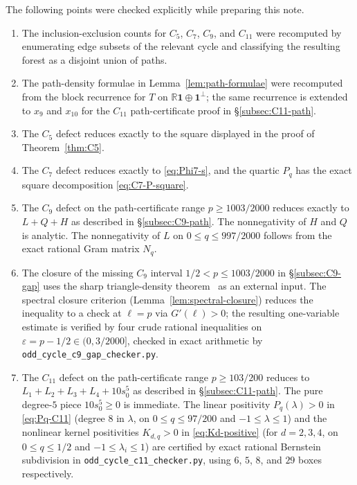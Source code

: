 \documentclass[11pt]{article}
\newcommand{\one}{\mathbf 1}
\newcommand{\eps}{\varepsilon}
\begin{document}
The following points were checked explicitly while preparing this note.
\begin{enumerate}[label=\textup{(\arabic*)}]
    \item The inclusion-exclusion counts for $C_5$, $C_7$, $C_9$, and $C_{11}$ were recomputed by enumerating edge subsets of the relevant cycle and classifying the resulting forest as a disjoint union of paths.
    \item The path-density formulae in Lemma~\ref{lem:path-formulae} were recomputed from the block recurrence for $T$ on $\mathbb R\one\oplus\one^\perp$; the same recurrence is extended to $x_9$ and $x_{10}$ for the $C_{11}$ path-certificate proof in \S\ref{subsec:C11-path}.
    \item The $C_5$ defect reduces exactly to the square displayed in the proof of Theorem~\ref{thm:C5}.
    \item The $C_7$ defect reduces exactly to \eqref{eq:Phi7-s}, and the quartic $P_q$ has the exact square decomposition \eqref{eq:C7-P-square}.
    \item The $C_9$ defect on the path-certificate range $p\ge1003/2000$ reduces exactly to $L+Q+H$ as described in \S\ref{subsec:C9-path}.  The nonnegativity of $H$ and $Q$ is analytic.  The nonnegativity of $L$ on $0\le q\le997/2000$ follows from the exact rational Gram matrix $N_q$.
    \item The closure of the missing $C_9$ interval $1/2<p\le1003/2000$ in \S\ref{subsec:C9-gap} uses the sharp triangle-density theorem~\cite{RazborovTriangles,ReiherCliqueDensity} as an external input.  The spectral closure criterion (Lemma~\ref{lem:spectral-closure}) reduces the inequality to a check at $\ell=p$ via $G'(\ell)>0$; the resulting one-variable estimate is verified by four crude rational inequalities on $\eps=p-1/2\in(0,3/2000]$, checked in exact arithmetic by \texttt{odd\_cycle\_c9\_gap\_checker.py}.
    \item The $C_{11}$ defect on the path-certificate range $p\ge103/200$ reduces to $L_1+L_2+L_3+L_4+10s_0^5$ as described in \S\ref{subsec:C11-path}.  The pure degree-$5$ piece $10s_0^5\ge0$ is immediate.  The linear positivity $P_q(\lambda)>0$ in \eqref{eq:Pq-C11} (degree $8$ in $\lambda$, on $0\le q\le 97/200$ and $-1\le\lambda\le1$) and the nonlinear kernel positivities $K_{d,q}>0$ in \eqref{eq:Kd-positive} (for $d=2,3,4$, on $0\le q\le1/2$ and $-1\le\lambda_i\le1$) are certified by exact rational Bernstein subdivision in \texttt{odd\_cycle\_c11\_checker.py}, using $6$, $5$, $8$, and $29$ boxes respectively.

\end{enumerate}
\end{document}
